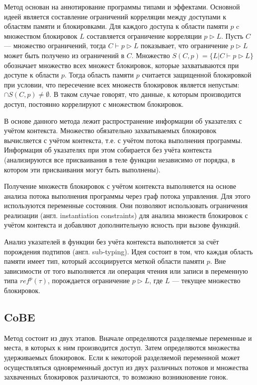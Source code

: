 Метод основан на аннотирование программы типами и эффектами. Основной идеей является составление ограничений корреляции между доступами к областям памяти и блокировками. Для каждого доступа к области памяти $p$ c множеством блокировок $L$ составляется ограничение корреляции $p \triangleright L$. Пусть $C$  — множество ограничений, тогда $C \vdash p \triangleright L$ показывает, что ограничение $p \triangleright L$ может быть получено из ограничений в $C$. Множество $S(C, p) = \{L | C \vdash p \triangleright L\}$ обозначает множество всех множест блокировок, которые захватываются при доступе к области $p$. Тогда область памяти $p$ считается защищенной блокировкой при условии, что пересечение всех множеств блокировок является непустым: $\cap S(C, p) \neq \emptyset$. В таком случае говорят, что данные, к которым производится доступ, постоянно коррелируют с множеством блокировок.

В основе данного метода лежит распространение информации об указателях с учётом контекста. Множество обязательно захватываемых блокировок вычисляется с учётом контекста, т.е. с учётом потока выполнения программы. Информация об указателях при этом собирается без учёта контекста (анализируются все присваивания в теле функции независимо от порядка, в котором эти присваивания могут быть выполнены).

Получение множеств блокировок с учётом контекста выполняется на основе анализа потока выполнения программы через граф потока управления. Для этого используются переменные состояния. Они позволяют использовать ограничения реализации (англ. instantiation constraints) для анализа множеств блокировок с учётом контекста и добавляют дополнительную ясность при вызове функций.

Анализ указателей в функции без учёта контекста выполняется за счёт порождения подтипов (англ. sub-typing). Идея состоит в том, что каждая область памяти имеет тип, который ассоциируется меткой области памяти $p$. Вне зависимости от того выполняется ли операция чтения или записи в переменную типа $ref^{p}(\tau)$, порождается ограничение $p \triangleright L$, где $L$ — текущее множество блокировок.

\subsection{CoBE}

Метод состоит из двух этапов. Вначале определяются разделяемые переменные и места, в которых к ним производится доступ. Затем определяются множества удерживаемых блокировок. Если к некоторой разделяемой переменной может осуществляться одновременный доступ из двух различных потоков и множества захваченных блокировок различаются, то возможно возникновение гонок.

